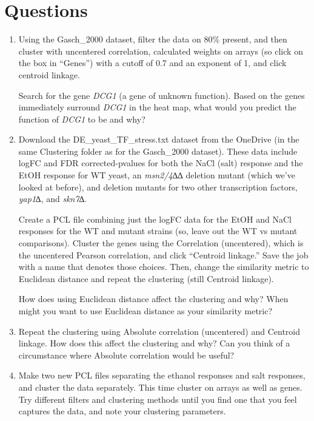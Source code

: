 \documentclass[
]{book}
\begin{document}
\hypertarget{questions-6}{%
\section{Questions}\label{questions-6}}

\begin{enumerate}
\def\labelenumi{\arabic{enumi}.}
\item
  Using the Gasch\_2000 dataset, filter the data on 80\% present, and then cluster with uncentered correlation, calculated weights on arrays (so click on the box in ``Genes'') with a cutoff of 0.7 and an exponent of 1, and click centroid linkage.

  Search for the gene \emph{DCG1} (a gene of unknown function). Based on the genes immediately surround \emph{DCG1} in the heat map, what would you predict the function of \emph{DCG1} to be and why?
\item
  Download the DE\_yeast\_TF\_stress.txt dataset from the OneDrive (in the same Clustering folder as for the Gasch\_2000 dataset). These data include logFC and FDR corrected-pvalues for both the NaCl (salt) response and the EtOH response for WT yeast, an \emph{msn2/4∆}∆ deletion mutant (which we've looked at before), and deletion mutants for two other transcription factors, \emph{yap1}∆, and \emph{skn7}∆.

  Create a PCL file combining just the logFC data for the EtOH and NaCl responses for the WT and mutant strains (so, leave out the WT vs mutant comparisons). Cluster the genes using the Correlation (uncentered), which is the uncentered Pearson correlation, and click ``Centroid linkage.'' Save the job with a name that denotes those choices. Then, change the similarity metric to Euclidean distance and repeat the clustering (still Centroid linkage).

  How does using Euclidean distance affect the clustering and why? When might you want to use Euclidean distance as your similarity metric?
\item
  Repeat the clustering using Absolute correlation (uncentered) and Centroid linkage. How does this affect the clustering and why? Can you think of a circumstance where Absolute correlation would be useful?
\item
  Make two new PCL files separating the ethanol responses and salt responses, and cluster the data separately. This time cluster on arrays as well as genes. Try different filters and clustering methods until you find one that you feel captures the data, and note your clustering parameters.


\end{enumerate}
\end{document}
